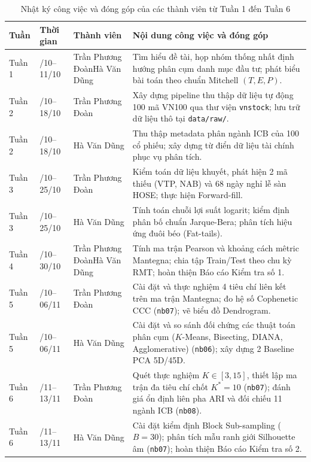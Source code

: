\documentclass[12pt,a4paper,oneside,openany]{report}
\newcommand{\svAten}{Trần Phương Đoàn}
\newcommand{\svBten}{Hà Văn Dũng}
\renewcommand{\arraystretch}{1.25}
\begin{document}
\begingroup
\footnotesize
{}
\setlength{\tabcolsep}{3.5pt}
\renewcommand{\arraystretch}{1.02}
\setlength{\intextsep}{6pt}
\begin{table}[H]
  \centering
  \caption{Nhật ký công việc và đóng góp của các thành viên từ Tuần 1 đến Tuần 6}
  \label{tab:nhatky}
  \begin{tabularx}{\textwidth}{|>{\centering\arraybackslash}p{1.2cm}|>{\centering\arraybackslash}p{2.2cm}|p{3.2cm}|X|}
    \hline
    \rowcolor{black!8}\textbf{Tuần} & \textbf{Thời gian} & \textbf{Thành viên} & \textbf{Nội dung công việc và đóng góp} \\ \hline
    Tuần 1 & 05/10--11/10 & \svAten \newline \svBten & Tìm hiểu đề tài, họp nhóm thống nhất định hướng phân cụm danh mục đầu tư; phát biểu bài toán theo chuẩn Mitchell $(T, E, P)$. \\ \hline
    Tuần 2 & 12/10--18/10 & \svAten & Xây dựng pipeline thu thập dữ liệu tự động 100 mã VN100 qua thư viện \texttt{vnstock}; lưu trữ dữ liệu thô tại \texttt{data/raw/}. \\ \hline
    Tuần 2 & 12/10--18/10 & \svBten & Thu thập metadata phân ngành ICB của 100 cổ phiếu; xây dựng từ điển dữ liệu tài chính phục vụ phân tích. \\ \hline
    Tuần 3 & 19/10--25/10 & \svAten & Kiểm toán dữ liệu khuyết, phát hiện 2 mã thiếu (VTP, NAB) và 68 ngày nghỉ lễ sàn HOSE; thực hiện Forward-fill. \\ \hline
    Tuần 3 & 19/10--25/10 & \svBten & Tính toán chuỗi lợi suất logarit; kiểm định phân bố chuẩn Jarque-Bera; phân tích hiệu ứng đuôi béo (Fat-tails). \\ \hline
    Tuần 4 & 26/10--30/10 & \svAten \newline \svBten & Tính ma trận Pearson và khoảng cách mêtric Mantegna; chia tập Train/Test theo chu kỳ RMT; hoàn thiện Báo cáo Kiểm tra số 1. \\ \hline
    Tuần 5 & 31/10--06/11 & \svAten & Cài đặt và thực nghiệm 4 tiêu chí liên kết trên ma trận Mantegna; đo hệ số Cophenetic CCC (\texttt{nb07}); vẽ biểu đồ Dendrogram. \\ \hline
    Tuần 5 & 31/10--06/11 & \svBten & Cài đặt và so sánh đối chứng các thuật toán phân cụm ($K$-Means, Bisecting, DIANA, Agglomerative) (\texttt{nb06}); xây dựng 2 Baseline PCA 5D/45D. \\ \hline
    Tuần 6 & 07/11--13/11 & \svAten & Quét thực nghiệm $K \in [3, 15]$, thiết lập ma trận đa tiêu chí chốt $K^*=10$ (\texttt{nb07}); đánh giá ổn định liên pha ARI và đối chiếu 11 ngành ICB (\texttt{nb08}). \\ \hline
    Tuần 6 & 07/11--13/11 & \svBten & Cài đặt kiểm định Block Sub-sampling ($B=30$); phân tích mẫu ranh giới Silhouette âm (\texttt{nb07}); hoàn thiện Báo cáo Kiểm tra số 2. \\ \hline
  \end{tabularx}
\end{table}
\endgroup
\end{document}
